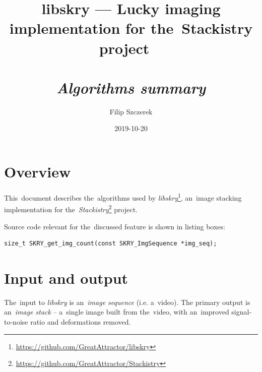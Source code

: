 \documentclass[12pt]{article}
\begin{document}
\title{libskry --- Lucky imaging implementation for the~Stackistry project
\ \\
\ \\
\emph{Algorithms summary}}
\author{Filip Szczerek}
\date{2019-10-20}
\maketitle

\tableofcontents


\newpage

\section{Overview}

This~document describes the~algorithms used by \emph{libskry}\footnote{\url{https://github.com/GreatAttractor/libskry}},
an~image stacking implementation for the~\emph{Stackistry}\footnote{\url{https://github.com/GreatAttractor/Stackistry}}
project.

Source code relevant for the~discussed feature is shown in listing boxes:

\begin{lstlisting}
size_t SKRY_get_img_count(const SKRY_ImgSequence *img_seq);
\end{lstlisting}

\section{Input and output}

The~input to \emph{libskry} is an~\emph{image sequence} (i.e. a~video). The primary output is an~\emph{image stack} --
a~single image built from the~video, with an~improved signal-to-noise ratio and deformations removed.
\end{document}
